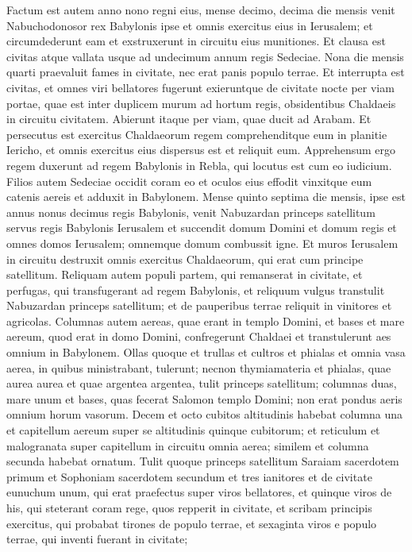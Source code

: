 \begin{biblechapter}  
\verse Factum est autem anno nono regni eius, mense decimo, decima die mensis venit Nabuchodonosor rex Babylonis ipse et omnis exercitus eius in Ierusalem; et circumdederunt eam et exstruxerunt in circuitu eius munitiones. 
\verse Et clausa est civitas atque vallata usque ad undecimum annum regis Sedeciae. 
\verse Nona die mensis quarti praevaluit fames in civitate, nec erat panis populo terrae.  
\verse Et interrupta est civitas, et omnes viri bellatores fugerunt exieruntque de civitate nocte per viam portae, quae est inter duplicem murum ad hortum regis, obsidentibus Chaldaeis in circuitu civitatem. Abierunt itaque per viam, quae ducit ad Arabam. 
\verse Et persecutus est exercitus Chaldaeorum regem comprehenditque eum in planitie Iericho, et omnis exercitus eius dispersus est et reliquit eum. 
\verse Apprehensum ergo regem duxerunt ad regem Babylonis in Rebla, qui locutus est cum eo iudicium. 
\verse Filios autem Sedeciae occidit coram eo et oculos eius effodit vinxitque eum catenis aereis et adduxit in Babylonem. 
\verse Mense quinto septima die mensis, ipse est annus nonus decimus regis Babylonis, venit Nabuzardan princeps satellitum servus regis Babylonis Ierusalem 
\verse et succendit domum Domini et domum regis et omnes domos Ierusalem; omnemque domum combussit igne. 
\verse Et muros Ierusalem in circuitu destruxit omnis exercitus Chaldaeorum, qui erat cum principe satellitum. 
\verse Reliquam autem populi partem, qui remanserat in civitate, et perfugas, qui transfugerant ad regem Babylonis, et reliquum vulgus transtulit Nabuzardan princeps satellitum; 
\verse et de pauperibus terrae reliquit in vinitores et agricolas. 
\verse Columnas autem aereas, quae erant in templo Domini, et bases et mare aereum, quod erat in domo Domini, confregerunt Chaldaei et transtulerunt aes omnium in Babylonem.  
\verse Ollas quoque et trullas et cultros et phialas et omnia vasa aerea, in quibus ministrabant, tulerunt; 
\verse necnon thymiamateria et phialas, quae aurea aurea et quae argentea argentea, tulit princeps satellitum; 
\verse columnas duas, mare unum et bases, quas fecerat Salomon templo Domini; non erat pondus aeris omnium horum vasorum. 
\verse Decem et octo cubitos altitudinis habebat columna una et capitellum aereum super se altitudinis quinque cubitorum; et reticulum et malogranata super capitellum in circuitu omnia aerea; similem et columna secunda habebat ornatum. 
\verse Tulit quoque princeps satellitum Saraiam sacerdotem primum et Sophoniam sacerdotem secundum et tres ianitores 
\verse et de civitate eunuchum unum, qui erat praefectus super viros bellatores, et quinque viros de his, qui steterant coram rege, quos repperit in civitate, et scribam principis exercitus, qui probabat tirones de populo terrae, et sexaginta viros e populo terrae, qui inventi fuerant in civitate; 

\end{biblechapter}
